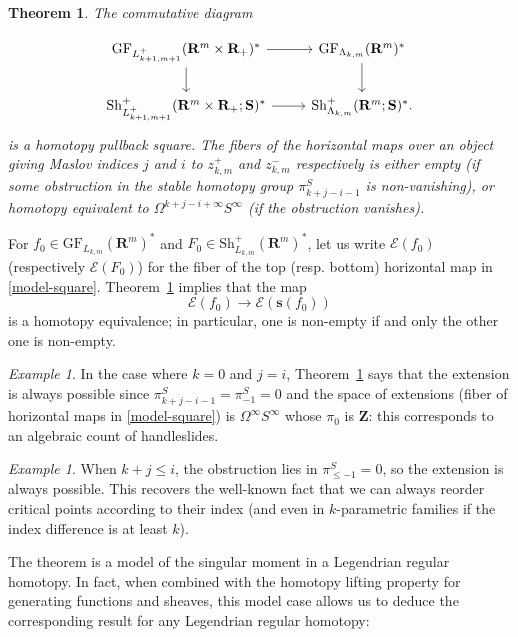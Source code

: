 \documentclass[12pt,a4paper]{article}
\numberwithin{equation}{section}
\newtheorem{thm}[equation]{Theorem}
\theoremstyle{definition}
\theoremstyle{remark}
\newtheorem{example}[equation]{Example}
\newcommand{\E}{\mathcal{E}}
\newcommand{\Z}{\mathbf{Z}}
\newcommand{\R}{\mathbf{R}}
\newcommand{\s}{\mathbf{s}}
\newcommand{\Sh}{\mathrm{Sh}}
\renewcommand{\S}{\mathbf{S}}
\newcommand{\GF}{\mathrm{GF}}
\begin{document}
\begin{thm}\label{thm:crossing-gf=sh}
The commutative diagram

\begin{equation}\label{model-square}
\begin{tikzcd}
\GF_{L_{k+1,m+1}^+}(\R^m\times \R_+)^* \arrow[d]\arrow[r] & \arrow[d] \GF_{\Lambda_{k,m}}(\R^m)^* \\
\Sh^+_{L_{k+1,m+1}^+}(\R^m\times \R_+;\S)^* \arrow[r] & \Sh_{\Lambda_{k,m}}^+(\R^m;\S)^*.
\end{tikzcd}
\end{equation}
is a homotopy pullback square. The fibers of the horizontal maps over an object giving Maslov indices $j$ and $i$
to $z^+_{k,m}$ and $z^-_{k,m}$ respectively is either empty (if some obstruction in the stable homotopy group $\pi_{k+j-i-1}^S$ is non-vanishing),
or homotopy equivalent to
$\Omega^{k+j-i+\infty}S^{\infty}$ (if the obstruction vanishes).
\end{thm}

For $f_0 \in \GF_{L_{k,m}}(\R^m)^*$ and $F_0\in\Sh^+_{L_{k,m}}(\R^m)^*$, let us write $\E(f_0)$ (respectively $\E(F_0)$)
for the fiber of the top (resp. bottom) horizontal map in \eqref{model-square}. Theorem~\ref{thm:crossing-gf=sh}
implies that the map
\begin{equation}
\E(f_0)\to \E(\s(f_0))
\end{equation}
is a homotopy equivalence; in particular,
one is non-empty if and only the other one is non-empty.

\begin{example}
In the case where $k=0$ and $j=i$, Theorem~\ref{thm:crossing-gf=sh} says that the extension is always possible since $\pi^S_{k+j-i-1}= \pi^S_{-1}=0$
and the space of extensions (fiber of horizontal maps in \eqref{model-square}) is
$\Omega^\infty S^\infty$
whose $\pi_0$ is $\Z$: this corresponds to an algebraic count of handleslides.
\end{example}

\begin{example}
When $k+j\leq i$, the obstruction lies in
$\pi^S_{\le -1} = 0$, so the extension is always possible.  This recovers the well-known fact that we can always reorder critical points according to their index (and even
in $k$-parametric families if the index difference is at least $k$).
\end{example}

The theorem is a model of the singular moment in a Legendrian regular homotopy.  In fact, when combined with the homotopy lifting property for generating functions and sheaves, this model case allows us to deduce the corresponding result
for any Legendrian regular homotopy:
\end{document}
